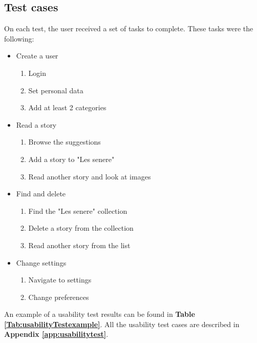 \subsection{Test cases}

On each test, the user received a set of tasks to complete. These tasks were the following:

\begin{itemize}
	\item Create a user 	
	\begin{enumerate}
		\item Login 
		\item Set personal data 
		\item Add at least 2 categories 
	\end{enumerate}
	\item Read a story 
	\begin{enumerate}
		\item Browse the suggestions 
		\item Add a story to "Les senere" 
		\item Read another story and look at images 
	\end{enumerate}
	\item Find and delete 
	\begin{enumerate}
		\item Find the "Les senere" collection
		\item Delete a story from the collection
		\item Read another story from the list 
	\end{enumerate}
	\item Change settings 
	\begin{enumerate}
		\item Navigate to settings 
		\item Change preferences 
	\end{enumerate}
	
\end{itemize}

An example of a usability test results can be found in \textbf{Table \ref{Tab:usabilityTestexample}}. All the usability test cases are described in \textbf{Appendix \ref{app:usabilitytest}}.

